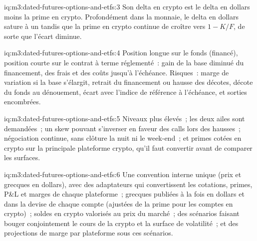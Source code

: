 \begin{solution}{iq:m3:dated-futures-options-and-etfs:3}
Son delta en crypto est le delta en dollars moins la prime en crypto. Profondément dans la monnaie, le delta en dollars sature à un tandis que la prime en crypto
continue de croître vers $1 - K/F$, de sorte que l'écart diminue.
\end{solution}

\begin{solution}{iq:m3:dated-futures-options-and-etfs:4}
Position longue sur le fonds (financé), position courte sur le contrat à terme réglementé~: gain de la base diminué du financement, des frais et des coûts jusqu'à l'échéance. Risques~: marge de variation si
la base s'élargit, retrait du financement ou hausse des décotes, décote du fonds au dénouement, écart avec l'indice de référence à l'échéance, et sorties encombrées.
\end{solution}

\begin{solution}{iq:m3:dated-futures-options-and-etfs:5}
Niveaux plus élevés~; les deux ailes sont demandées~; un skew pouvant s'inverser en faveur des calls lors des hausses~; négociation continue, sans clôture la nuit ni le week-end~; et
primes cotées en crypto sur la principale plateforme crypto, qu'il faut convertir avant de comparer les surfaces.
\end{solution}

\begin{solution}{iq:m3:dated-futures-options-and-etfs:6}
Une convention interne unique (prix et grecques en dollars), avec des adaptateurs qui convertissent les cotations, primes, P\&L et marges de chaque plateforme~; grecques
publiées à la fois en dollars et dans la devise de chaque compte (ajustées de la prime pour les comptes en crypto)~; soldes en crypto valorisés au prix du marché~;
des scénarios faisant bouger conjointement le cours de la crypto et la surface de volatilité~; et des projections de marge par plateforme sous ces scénarios.
\end{solution}
